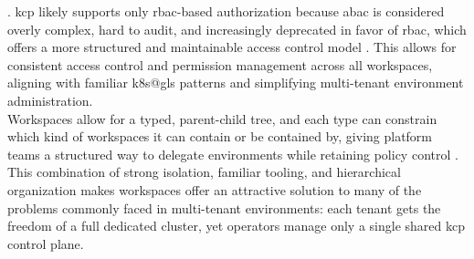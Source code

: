 \documentclass[11pt, a4paper, oneside, listof=totoc]{scrartcl}
\begin{document}
                \parencites{kcpAuthorization}{kubernetesABAC}.
                \gls{kcp} likely supports only \gls{rbac}-based authorization because \gls{abac} is
                considered overly complex, hard to audit, and increasingly deprecated in favor of
                \gls{rbac}, which offers a more structured and maintainable access control model
                \parencite{kubernetesRBACBlog}.
                This allows for consistent access control and permission management across all
                workspaces, aligning with familiar \gls{k8s@gls} patterns and simplifying
                multi-tenant environment administration.
                \\
                Workspaces allow for a typed, parent-child tree, and each type can constrain which
                kind of workspaces it can contain or be contained by, giving platform teams a
                structured way to delegate environments while retaining policy control
                \parencite{kcpWorkspaces}.
                \\
                This combination of strong isolation, familiar tooling, and hierarchical
                organization makes workspaces offer an attractive solution to many of the problems
                commonly faced in multi-tenant environments: each tenant gets the freedom of a full
                dedicated cluster, yet operators manage only a single shared \gls{kcp} control
                plane.
            
\end{document}
